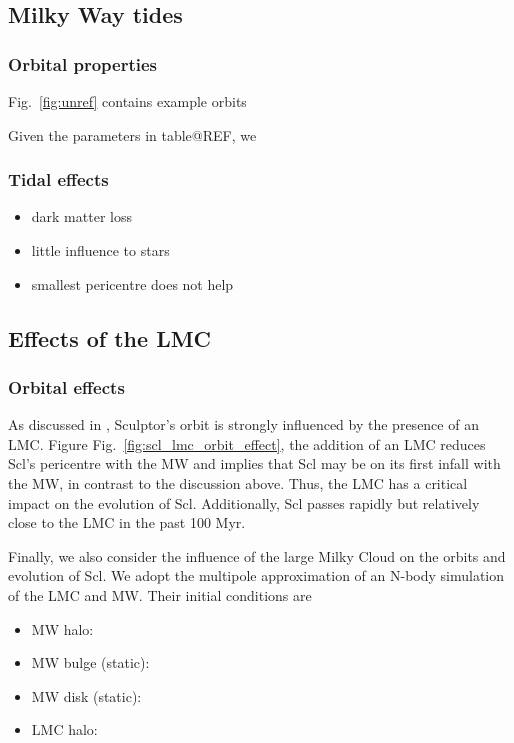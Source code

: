 \subsection{Milky Way tides}\label{milky-way-tides}

\subsubsection{Orbital properties}\label{orbital-properties}

Fig.~\ref{fig:unref} contains example orbits

Given the parameters in table@REF, we

\subsubsection{Tidal effects}\label{tidal-effects}

\begin{itemize}
\tightlist
\item
  dark matter loss
\item
  little influence to stars
\item
  smallest pericentre does not help
\end{itemize}

\subsection{Effects of the LMC}\label{effects-of-the-lmc}

\subsubsection{Orbital effects}\label{orbital-effects}

As discussed in \citet{battaglia+2022}, Sculptor's orbit is strongly
influenced by the presence of an LMC. Figure
Fig.~\ref{fig:scl_lmc_orbit_effect}, the addition of an LMC reduces
Scl's pericentre with the MW and implies that Scl may be on its first
infall with the MW, in contrast to the discussion above. Thus, the LMC
has a critical impact on the evolution of Scl. Additionally, Scl passes
rapidly but relatively close to the LMC in the past 100 Myr.

Finally, we also consider the influence of the large Milky Cloud on the
orbits and evolution of Scl. We adopt the \citet{vasiliev2024} multipole
approximation of an N-body simulation of the LMC and MW. Their initial
conditions are

\begin{itemize}
\tightlist
\item
  MW halo:
\item
  MW bulge (static):
\item
  MW disk (static):
\item
  LMC halo:
\end{itemize}

